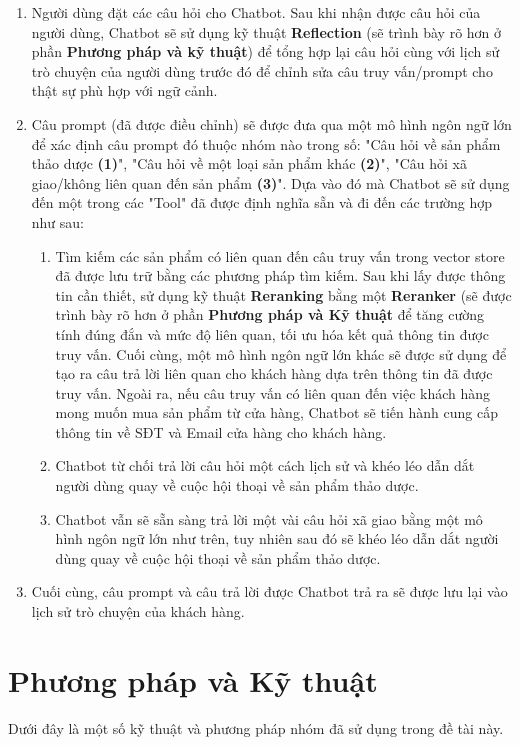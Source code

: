 \documentclass{article}
\numberwithin{equation}{section}
\numberwithin{equation}{section}
\begin{document}
\begin{enumerate}
    \item Người dùng đặt các câu hỏi cho Chatbot. Sau khi nhận được câu hỏi của người dùng, Chatbot sẽ sử dụng kỹ thuật \textbf{Reflection} (sẽ trình bày rõ hơn ở phần \textbf{Phương pháp và kỹ thuật}) để tổng hợp lại câu hỏi cùng với lịch sử trò chuyện của người dùng trước đó để chỉnh sửa câu truy vấn/prompt cho thật sự phù hợp với ngữ cảnh. 
    \item Câu prompt (đã được điều chỉnh) sẽ được đưa qua một mô hình ngôn ngữ lớn để xác định câu prompt đó thuộc nhóm nào trong số: "Câu hỏi về sản phẩm thảo dược \textbf{(1)}", "Câu hỏi về một loại sản phẩm khác \textbf{(2)}", "Câu hỏi xã giao/không liên quan đến sản phẩm \textbf{(3)}". Dựa vào đó mà Chatbot sẽ sử dụng đến một trong các "Tool" đã được định nghĩa sẵn và đi đến các trường hợp như sau:
    \begin{enumerate}[(1)]
        \item Tìm kiếm các sản phẩm có liên quan đến câu truy vấn trong vector store đã được lưu trữ bằng các phương pháp tìm kiếm. Sau khi lấy được thông tin cần thiết, sử dụng kỹ thuật \textbf{Reranking} bằng một \textbf{Reranker} (sẽ được trình bày rõ hơn ở phần \textbf{Phương pháp và Kỹ thuật} để tăng cường tính đúng đắn và mức độ liên quan, tối ưu hóa kết quả thông tin được truy vấn. Cuối cùng, một mô hình ngôn ngữ lớn khác sẽ được sử dụng để tạo ra câu trả lời liên quan cho khách hàng dựa trên thông tin đã được truy vấn. Ngoài ra, nếu câu truy vấn có liên quan đến việc khách hàng mong muốn mua sản phẩm từ cửa hàng, Chatbot sẽ tiến hành cung cấp thông tin về SĐT và Email cửa hàng cho khách hàng.
        \item Chatbot từ chối trả lời câu hỏi một cách lịch sử và khéo léo dẫn dắt người dùng quay về cuộc hội thoại về sản phẩm thảo dược.
        \item Chatbot vẫn sẽ sẵn sàng trả lời một vài câu hỏi xã giao bằng một mô hình ngôn ngữ lớn như trên, tuy nhiên sau đó sẽ khéo léo dẫn dắt người dùng quay về cuộc hội thoại về sản phẩm thảo dược.
    \end{enumerate}
    \item Cuối cùng, câu prompt và câu trả lời được Chatbot trả ra sẽ được lưu lại vào lịch sử trò chuyện của khách hàng.
\end{enumerate}
\section{\textbf{Phương pháp và Kỹ thuật}}
Dưới đây là một số kỹ thuật và phương pháp nhóm đã sử dụng trong đề tài này.
\end{document}
